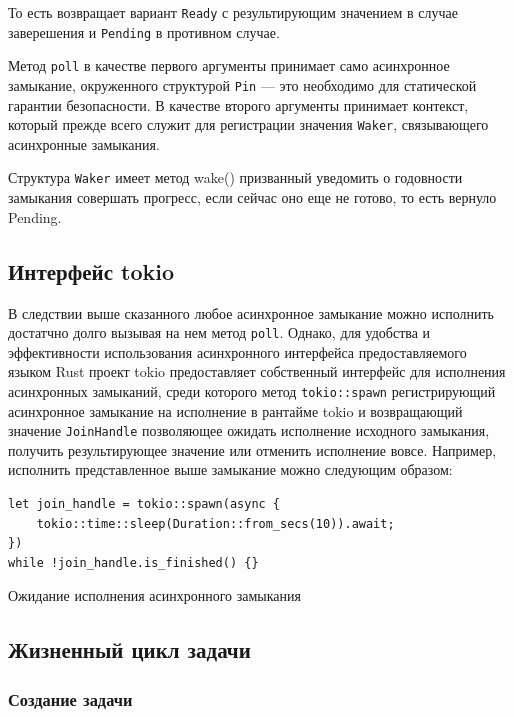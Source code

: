 То есть возвращает вариант \verb|Ready| с результирующим значением в случае заверешения и \verb|Pending| в противном случае.

Метод \verb|poll| в качестве первого аргументы принимает само асинхронное замыкание, окруженного структурой \verb|Pin| --- это необходимо для статической гарантии безопасности. В качестве второго аргументы принимает контекст, который прежде всего служит для регистрации значения \verb|Waker|, связывающего асинхронные замыкания.

Структура \verb|Waker| имеет метод wake() призванный уведомить о годовности замыкания совершать прогресс, если сейчас оно еще не готово, то есть вернуло Pending.

\subsection{Интерфейс tokio}

В следствии выше сказанного любое асинхронное замыкание можно исполнить достатчно долго вызывая на нем метод \verb|poll|. Однако, для удобства и эффективности использования асинхронного интерфейса предоставляемого языком Rust проект tokio предоставляет собственный интерфейс для исполнения асинхронных замыканий, среди которого метод \verb|tokio::spawn| регистрирующий асинхронное замыкание на исполнение в рантайме tokio и возвращающий значение \verb|JoinHandle| позволяющее ожидать исполнение исходного замыкания, получить результирующее значение или отменить исполнение вовсе. Например, исполнить представленное выше замыкание можно следующим образом:

\begin{listing}[H]
    \begin{verbatim}
let join_handle = tokio::spawn(async {
    tokio::time::sleep(Duration::from_secs(10)).await;
})
while !join_handle.is_finished() {}
    \end{verbatim}

    \caption{Ожидание исполнения асинхронного замыкания}
    \label{listing:tokio_spawn::sleep}
\end{listing}

\subsection{Жизненный цикл задачи}

\subsubsection{Создание задачи}

